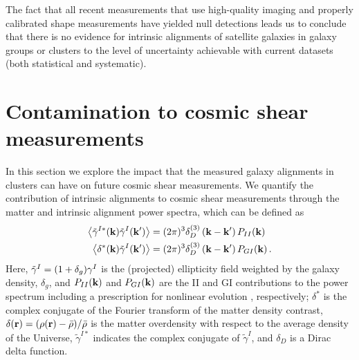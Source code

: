 The fact that all recent measurements that use high-quality imaging and properly calibrated 
shape measurements have yielded null detections \citep[][plus the present 
study]{hao11,hung12,schneider13,chisari14} leads us to conclude that there is no evidence for 
intrinsic alignments of satellite galaxies in galaxy groups or clusters to the level of 
uncertainty achievable with current datasets (both statistical and systematic).


\section{Contamination to cosmic shear measurements}\label{s:ps}

In this section we explore the impact that the measured galaxy alignments in clusters can have on 
future cosmic shear measurements. We quantify the contribution of intrinsic alignments to cosmic 
shear measurements through the matter and intrinsic alignment power spectra, which can be defined as
\begin{equation}\label{eq:EBspectraDef}
\begin{split}
 \left\langle\tilde{\gamma}^{I*} (\mathbf{k})\tilde{\gamma}^{I}(\mathbf{k}')\right\rangle &=
(2\pi)^3\delta^{(3)}_{D}\left(\mathbf{k}-\mathbf{k}'\right) P_{II}(\mathbf{k}) \\
 \left\langle \delta^{*}(\mathbf{k})\tilde{\gamma}^{I}(\mathbf{k}')\right\rangle &=
(2\pi)^3\delta^{(3)}_{D}\left(\mathbf{k}-\mathbf{k}'\right) P_{GI}(\mathbf{k})\,.
\end{split}
\end{equation}
Here, $\tilde{\gamma}^{I}=(1+\delta_g)\gamma^I$ is the (projected) ellipticity field weighted by the 
galaxy density, $\delta_g$, and $P_{II}(\mathbf{k})$ and $P_{GI}(\mathbf{k})$ are the II and GI contributions to 
the power spectrum including a prescription for nonlinear evolution \citep[i.e, nonlinear power 
spectra, see][]{smith03,bridle07}, respectively; $\delta^{*}$ is the complex conjugate of the 
Fourier transform of the matter density contrast, $\delta(\mathbf{r}) = (\rho(\mathbf{r})-{\bar \rho})/{\bar 
\rho}$ is the matter overdensity with respect to the average density of the Universe, 
$\tilde{\gamma}^{I*}$ indicates the complex conjugate of $\tilde\gamma^I$, and $\delta_D$ is a 
Dirac delta function.


